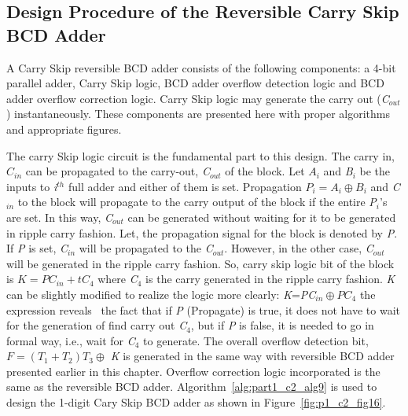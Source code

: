 \subsection{Design Procedure of the Reversible Carry Skip BCD Adder}

A Carry Skip reversible BCD adder consists of the following components: a 4-bit parallel adder, Carry Skip logic, BCD adder overflow detection logic and BCD adder overflow correction logic. Carry Skip logic may generate the carry out ({\it C}${}_{out}$) instantaneously. These components are presented here with proper algorithms and appropriate figures.

The carry Skip logic circuit is the fundamental part to this design. The carry in, $C{}_{in}$ can be propagated to the carry-out, {\it C}${}_{out}$ of the block. Let $A{}_{i}$ and {\it B${}_{i}$} be the inputs to {\it i${}^{th}$} full adder and either of them is set. Propagation $P{}_{i}={A{}_{i}}\oplus B{}_{i}$ and {\it C}${}_{in}$ to the block will propagate to the carry output of the block if the entire {\it P${}_{i}$}'s are set. In this way, {\it C}${}_{out}$ can be generated without waiting for it to be generated in ripple carry fashion. Let, the propagation signal for the block is denoted by {\it P}. If {\it P }is set, {\it C}${}_{in}$ will be propagated to the {\it C}${}_{out}$. However, in the other case, {\it C}${}_{out}$ will be generated in the ripple carry fashion. So, carry skip logic bit of the block is $K ={ PC}{}_{in}+t C{}_{4}$ where {\it C}${}_{4}$ is the carry generated in the ripple carry fashion. {\it K } can be slightly modified to realize the logic more clearly: {\it K}={\it PC}${}_{in}\oplus${\it ${P}C$}${}_{4}$ the expression reveals~ the fact that if {\it P }(Propagate) is true, it does not have to wait for the generation of find carry out {\it C}${}_{4}$, but if {\it P }is false, it is needed to go in formal way, i.e., wait for {\it C${}_{4}$} to generate. The overall overflow detection bit, $F= (T{}_{1}+T{}_{2})T{}_{3}\oplus$ {\it K }is generated in the same way with reversible BCD adder presented earlier in this chapter. Overflow correction logic incorporated is the same as the reversible BCD adder.
Algorithm~\ref{alg:part1_c2_alg9} is used to design the 1-digit Cary Skip BCD adder as shown in Figure~\ref{fig:p1_c2_fig16}.


